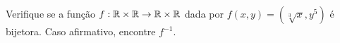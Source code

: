 \documentclass{beamer}
\begin{document}
    \begin{frame}
        \begin{exemplo}
            Verifique se a fun\c{c}\~ao $f : \mathbb{R} \times \mathbb{R} \to \mathbb{R} \times \mathbb{R}$ dada por $f(x,y) = (\sqrt[3]{x}, y^5)$ \'e bijetora. Caso afirmativo, encontre $f^{-1}$.
            \vspace{6cm}
        \end{exemplo}
    \end{frame}

    \begin{frame}
        \begin{exemplo}
            \vspace{7cm}
        \end{exemplo}
    \end{frame}

    \begin{frame}
        \begin{exemplo}
            \vspace{7cm}
        \end{exemplo}
    \end{frame}
\end{document}
